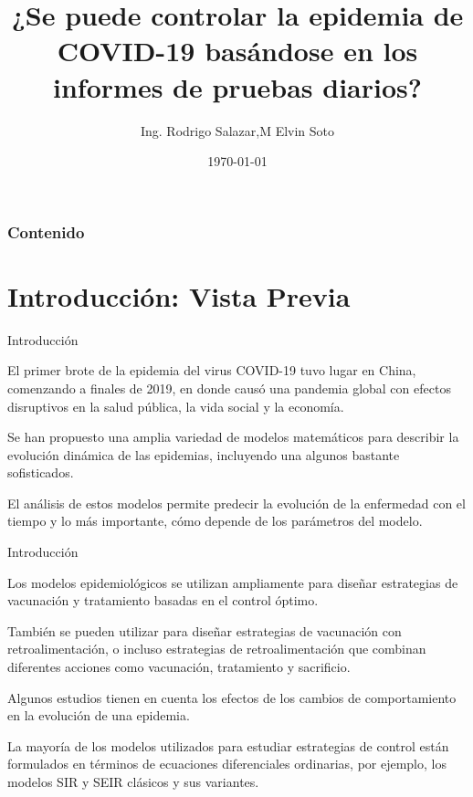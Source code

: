 \documentclass{beamer}
\title{¿Se puede controlar la epidemia de COVID-19 basándose en los informes de pruebas diarios?}
\author{Ing. Rodrigo Salazar,M Elvin Soto}
\institute{UACH}
\date{\today}
\begin{document}
\begin{frame}
  \titlepage
\end{frame}


\begin{frame}
  \frametitle{Contenido}
  \tableofcontents
\end{frame}


\section{Introducción: Vista Previa}
\begin{frame}{Introducción}

\begin{justify}  
El primer brote de la epidemia del virus COVID-19 tuvo lugar en China, comenzando a finales de 2019, en donde causó una pandemia global con efectos disruptivos en la salud pública, la vida social y la economía.

\vspace{0.3cm}
Se han propuesto una amplia variedad de modelos matemáticos para describir la evolución dinámica de las epidemias, incluyendo una algunos bastante sofisticados.

\vspace{0.3cm}
El análisis de estos modelos permite predecir la evolución de la enfermedad con el tiempo y lo más importante, cómo depende de los parámetros del modelo.

\end{justify}
\end{frame}


\begin{frame}{Introducción}

\begin{justify}  
Los modelos epidemiológicos se utilizan ampliamente para diseñar estrategias de vacunación y tratamiento basadas en el control óptimo. 

\vspace{0.3cm}
También se pueden utilizar para diseñar estrategias de vacunación con retroalimentación, o incluso estrategias de retroalimentación que combinan diferentes acciones como vacunación, tratamiento y sacrificio. 

\vspace{0.3cm}
Algunos estudios tienen en cuenta los efectos de los cambios de comportamiento en la evolución de una epidemia. 

\vspace{0.3cm}
La mayoría de los modelos utilizados para estudiar estrategias de control están formulados en términos de ecuaciones diferenciales ordinarias, por ejemplo, los modelos SIR y SEIR clásicos y sus variantes. 


\end{justify}
\end{frame}
\end{document}
